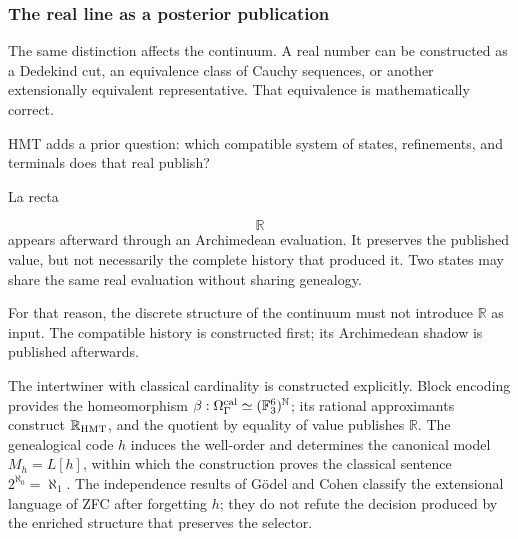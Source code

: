 \subsubsection{The real line as a posterior publication}
The same distinction affects the continuum. A real number can be constructed as a Dedekind cut, an equivalence class of Cauchy sequences, or another extensionally equivalent representative. That equivalence is mathematically correct.\par
HMT adds a prior question: which compatible system of states, refinements, and terminals does that real publish?\par
La recta\par
\[
\mathbb R
\]
appears afterward through an Archimedean evaluation. It preserves the published value, but not necessarily the complete history that produced it. Two states may share the same real evaluation without sharing genealogy.\par
For that reason, the discrete structure of the continuum must not introduce \(\mathbb R\) as input. The compatible history is constructed first; its Archimedean shadow is published afterwards.\par
The intertwiner with classical cardinality is constructed explicitly. Block encoding provides the homeomorphism \(\beta:\Omega_\Gamma^{\rm cal}\simeq(\mathbb F_3^6)^{\mathbb N}\); its rational approximants construct \(\mathbb R_{\rm HMT}\), and the quotient by equality of value publishes \(\mathbb R\). The genealogical code \(h\) induces the well-order and determines the canonical model \(M_h=L[h]\), within which the construction proves the classical sentence \(2^{\aleph_0}=\aleph_1\). The independence results of Gödel and Cohen classify the extensional language of ZFC after forgetting \(h\); they do not refute the decision produced by the enriched structure that preserves the selector.\par
{}
